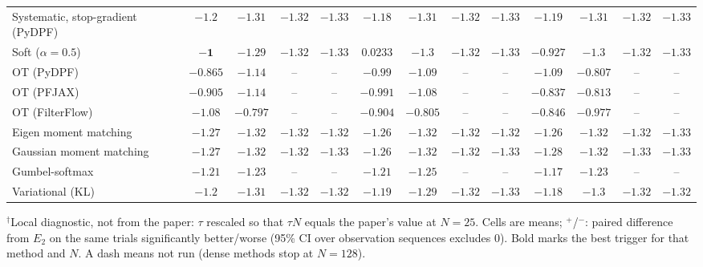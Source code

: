 \begin{table}[ht]
\begin{adjustbox}{max width=\linewidth}
\begin{tabular}{lcccc|cccc|cccc}
Systematic, stop-gradient (PyDPF) & $\mathbf{-1.2}$ & $-1.31$ & $\mathbf{-1.32}$ & $\mathbf{-1.33}$ & $-1.18$ & $-1.31$ & $-1.32$ & $-1.33$ & $-1.19$ & $\mathbf{-1.31}$ & $-1.32$ & $-1.33$ \\
Soft ($\alpha{=}0.5$) & $\mathbf{-1}$ & $-1.29$ & $-1.32$ & $\mathbf{-1.33}$ & $0.0233$ & $\mathbf{-1.3}$ & $\mathbf{-1.32}$ & $-1.33$ & $-0.927$ & $-1.3$ & $-1.32$ & $-1.33$ \\
OT (PyDPF) & $-0.865$ & $\mathbf{-1.14}$ & -- & -- & $-0.99$ & $-1.09$ & -- & -- & $\mathbf{-1.09}$ & $-0.807$ & -- & -- \\
OT (PFJAX) & $-0.905$ & $\mathbf{-1.14}$ & -- & -- & $\mathbf{-0.991}$ & $-1.08$ & -- & -- & $-0.837$ & $-0.813$ & -- & -- \\
OT (FilterFlow) & $\mathbf{-1.08}$ & $-0.797$ & -- & -- & $-0.904$ & $-0.805$ & -- & -- & $-0.846$ & $\mathbf{-0.977}$ & -- & -- \\
Eigen moment matching & $\mathbf{-1.27}$ & $-1.32$ & $-1.32$ & $-1.32$ & $-1.26$ & $\mathbf{-1.32}$ & $\mathbf{-1.32}$ & $-1.32$ & $-1.26$ & $-1.32$ & $-1.32$ & $\mathbf{-1.33}$ \\
Gaussian moment matching & $-1.27$ & $-1.32$ & $-1.32$ & $-1.33$ & $-1.26$ & $\mathbf{-1.32}$ & $-1.32$ & $-1.33$ & $\mathbf{-1.28}$ & $-1.32$ & $\mathbf{-1.33}$ & $\mathbf{-1.33}$ \\
Gumbel-softmax & $\mathbf{-1.21}$ & $-1.23$ & -- & -- & $-1.21$ & $\mathbf{-1.25}$ & -- & -- & $-1.17$ & $-1.23$ & -- & -- \\
Variational (KL) & $\mathbf{-1.2}$ & $\mathbf{-1.31}$ & $-1.32$ & $-1.32$ & $-1.19$ & $-1.29$ & $-1.32$ & $\mathbf{-1.33}$ & $-1.18$ & $-1.3$ & $\mathbf{-1.32}$ & $-1.32$ \\
\bottomrule
\end{tabular}
\end{adjustbox}
\par\smallskip\parbox{0.95\linewidth}{\footnotesize $^\dagger$Local diagnostic, not from the paper: $\tau$ rescaled so that $\tau N$ equals the paper's value at $N{=}25$. Cells are means; $^{+}$/$^{-}$: paired difference from $E_2$ on the same trials significantly better/worse (95\% CI over observation sequences excludes 0). Bold marks the best trigger for that method and $N$. A dash means not run (dense methods stop at $N{=}128$).}
\end{table}

